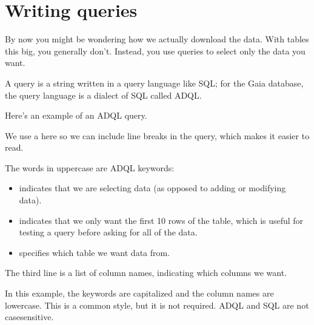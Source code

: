 \documentclass[letterpaper,10pt,english]{sphinxmanual}
\begin{document}
\section{Writing queries}
\label{\detokenize{01_query:writing-queries}}
By now you might be wondering how we actually download the data.  With tables this big, you generally don’t.  Instead, you use queries to select only the data you want.

A query is a string written in a query language like SQL; for the Gaia database, the query language is a dialect of SQL called ADQL.

Here’s an example of an ADQL query.

\begin{sphinxVerbatim}[commandchars=\\\{\}]
  
\end{sphinxVerbatim}

 We use a  here so we can include line breaks in the query, which makes it easier to read.

The words in uppercase are ADQL keywords:
\begin{itemize}
\item {} 
 indicates that we are selecting data (as opposed to adding or modifying data).

\item {} 
 indicates that we only want the first 10 rows of the table, which is useful for testing a query before asking for all of the data.

\item {} 
 specifies which table we want data from.

\end{itemize}

The third line is a list of column names, indicating which columns we want.

In this example, the keywords are capitalized and the column names are lowercase.  This is a common style, but it is not required.  ADQL and SQL are not case\sphinxhyphen{}sensitive.
\end{document}
